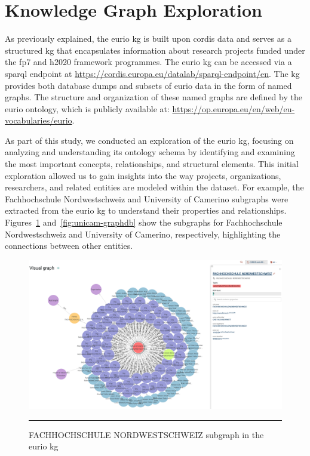 \section*{Knowledge Graph Exploration}
As previously explained, the \gls{eurio} \acrlong{kg} \cite{CORDIS_EURIO_2022} is built upon \gls{cordis} data and serves as a structured \gls{kg} that encapsulates information about research projects funded under the \gls{fp7} and \gls{h2020} framework programmes.
The \gls{eurio} \gls{kg} can be accessed via a \gls{sparql} endpoint at \url{https://cordis.europa.eu/datalab/sparql-endpoint/en}.
The \gls{kg} provides both database dumps and subsets of \gls{eurio} data in the form of named graphs.
The structure and organization of these named graphs are defined by the \gls{eurio} ontology, which is publicly available at: \url{https://op.europa.eu/en/web/eu-vocabularies/eurio}.

As part of this study, we conducted an exploration of the \gls{eurio} \gls{kg}, focusing on analyzing and understanding its ontology schema by identifying and examining the most important concepts, relationships, and structural elements.
This initial exploration allowed us to gain insights into the way projects, organizations, researchers, and related entities are modeled within the dataset.
For example, the Fachhochschule Nordwestschweiz and University of Camerino  subgraphs were extracted from the \gls{eurio} \gls{kg} to understand their properties and relationships.
Figures~\ref{fig:fhnw-graphdb} and~\ref{fig:unicam-graphdb} show the subgraphs for Fachhochschule Nordwestschweiz and University of Camerino, respectively, highlighting the connections between other entities.

\begin{figure}[htbp]
    \centering
 \includegraphics[width=.9\textwidth]{figures/architecture/graphdb-fhnw.png}
     \rule{35em}{0.5pt}
    \caption{FACHHOCHSCHULE NORDWESTSCHWEIZ subgraph in the \gls{eurio} \gls{kg}}
 \label{fig:fhnw-graphdb}
\end{figure}

